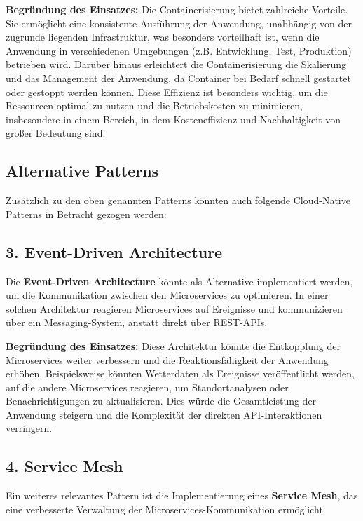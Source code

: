 \textbf{Begründung des Einsatzes:} 
Die Containerisierung bietet zahlreiche Vorteile. Sie ermöglicht eine konsistente Ausführung der Anwendung, unabhängig von der zugrunde liegenden Infrastruktur, was besonders vorteilhaft ist, wenn die Anwendung in verschiedenen Umgebungen (z.B. Entwicklung, Test, Produktion) betrieben wird. Darüber hinaus erleichtert die Containerisierung die Skalierung und das Management der Anwendung, da Container bei Bedarf schnell gestartet oder gestoppt werden können. Diese Effizienz ist besonders wichtig, um die Ressourcen optimal zu nutzen und die Betriebskosten zu minimieren, insbesondere in einem Bereich, in dem Kosteneffizienz und Nachhaltigkeit von großer Bedeutung sind.

\subsection{Alternative Patterns}

Zusätzlich zu den oben genannten Patterns könnten auch folgende Cloud-Native Patterns in Betracht gezogen werden:

\subsection{3. Event-Driven Architecture}

Die \textbf{Event-Driven Architecture} könnte als Alternative implementiert werden, um die Kommunikation zwischen den Microservices zu optimieren. In einer solchen Architektur reagieren Microservices auf Ereignisse und kommunizieren über ein Messaging-System, anstatt direkt über REST-APIs.

\textbf{Begründung des Einsatzes:} 
Diese Architektur könnte die Entkopplung der Microservices weiter verbessern und die Reaktionsfähigkeit der Anwendung erhöhen. Beispielsweise könnten Wetterdaten als Ereignisse veröffentlicht werden, auf die andere Microservices reagieren, um Standortanalysen oder Benachrichtigungen zu aktualisieren. Dies würde die Gesamtleistung der Anwendung steigern und die Komplexität der direkten API-Interaktionen verringern.

\subsection{4. Service Mesh}

Ein weiteres relevantes Pattern ist die Implementierung eines \textbf{Service Mesh}, das eine verbesserte Verwaltung der Microservices-Kommunikation ermöglicht.

